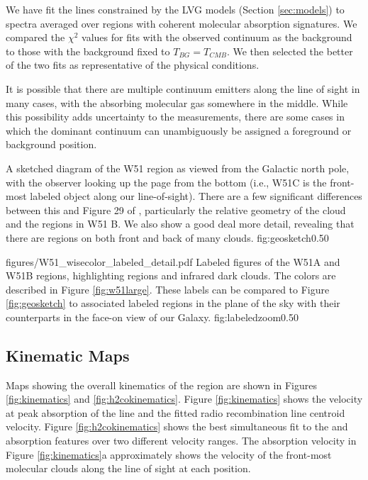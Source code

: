We have fit the \formaldehyde lines constrained by the LVG models (Section
\ref{sec:models}) to spectra averaged over regions with coherent molecular
absorption signatures.  We compared the $\chi^2$ values for fits with the
observed continuum as the background to those with the background fixed to
$T_{BG} = T_{CMB}$.  We then selected the better of the two fits as
representative of the physical conditions.

It is possible that there are multiple continuum emitters along the line of
sight in many cases, with the absorbing molecular gas somewhere in the middle.
While this possibility adds uncertainty to the measurements, there are some
cases in which the dominant continuum can unambiguously be assigned a
foreground or background position.

{A sketched diagram of the W51 region as viewed from the Galactic north pole,
with the observer looking up the page from the bottom (i.e., W51C is the 
front-most labeled object along our line-of-sight).  There are a few
significant differences between this and Figure 29 of \citet{Kang2010a},
particularly the relative geometry of the cloud and the \hii regions in W51 B.
We also show a good deal more detail, revealing that there are \hii regions on
both front and back of many clouds.
}
{fig:geosketch}{0.5}{0}

\Figure
{figures/W51_wisecolor_labeled_detail.pdf}
{Labeled figures of the W51A and W51B regions, highlighting \hii regions and
infrared dark clouds.   The colors are described in Figure \ref{fig:w51large}.
These labels can be compared to Figure \ref{fig:geosketch} to associated
labeled regions in the plane of the sky with their counterparts in the face-on
view of our Galaxy.}
{fig:labeledzoom}{0.5}{0}


\subsection{Kinematic Maps}
\label{sec:kinematics}
Maps showing the overall kinematics of the region are shown in Figures
\ref{fig:kinematics} and \ref{fig:h2cokinematics}.  Figure \ref{fig:kinematics}
shows the velocity at peak absorption of the \formaldehyde \oneone line and the
fitted radio recombination line centroid velocity.  Figure
\ref{fig:h2cokinematics} shows the best simultaneous fit to the \formaldehyde
\oneone and \twotwo absorption features over two different velocity ranges.
The \oneone absorption velocity in Figure \ref{fig:kinematics}a approximately
shows the velocity of the front-most molecular clouds along the line of sight
at each position.

